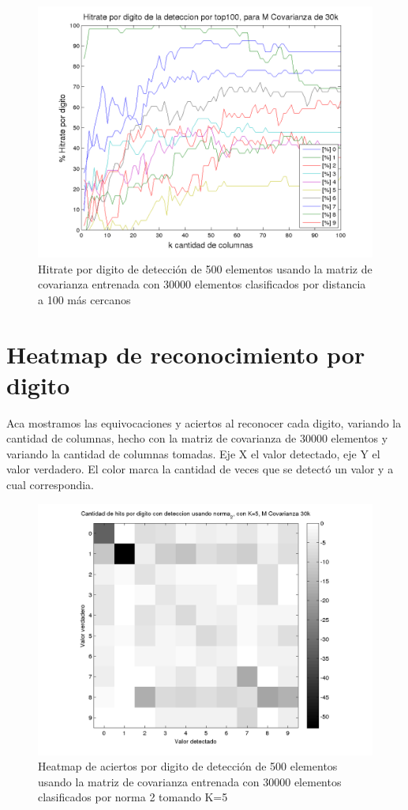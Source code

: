 \begin{figure}[H]
\begin {center}
\includegraphics[width=\pdwidth]{plots/pordig-30kcv-top100.png}
\end {center}
\caption{Hitrate por digito de detecci\'on de 500 elementos usando la matriz de covarianza entrenada con 30000 elementos
clasificados por distancia a 100 m\'as cercanos}
\label{fig:HRD30kcv-dist100}
\end{figure}

\section{Heatmap de reconocimiento por digito}
Aca mostramos las equivocaciones y aciertos al reconocer cada digito, variando la cantidad de columnas, hecho con la matriz de covarianza de
30000 elementos y variando la cantidad de columnas tomadas. Eje X el valor detectado, eje Y el valor verdadero. El color marca la cantidad
de veces que se detect\'o un valor y a cual correspondia.
\def \hmwidth {500pt}
\begin{figure}[H]
\includegraphics[width=\hmwidth]{plots/heatmap-30kcv-k5-norma_2.png}
\caption{Heatmap de aciertos por digito de detecci\'on de 500 elementos usando la matriz de covarianza entrenada con 30000 elementos
clasificados por norma 2 tomando K=5}
\label{fig:HM30kcv-k5}
\end{figure}

